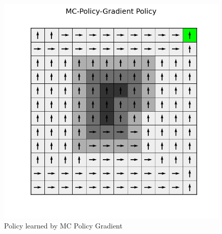 \documentclass[a4paper]{article}
\begin{document}
\begin{figure}[htbp!]
\center
\includegraphics[scale=0.75]{A/MC-Policy-Gradient-policy.png}
\caption{Policy learned by MC Policy Gradient}
\end{figure}
\end{document}
